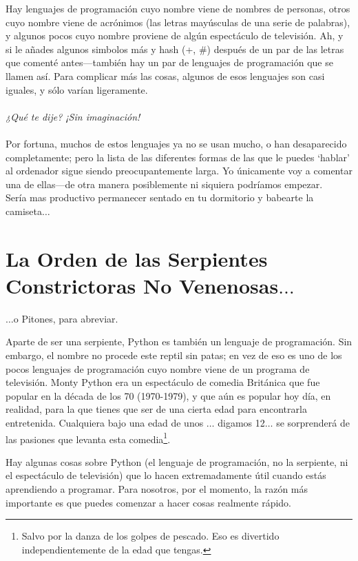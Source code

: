 Hay lenguajes de programación cuyo nombre viene de nombres de personas, otros cuyo nombre viene de acrónimos (las letras mayúsculas de una serie de palabras), y algunos pocos cuyo nombre proviene de algún espectáculo de televisión. Ah, y si le añades algunos simbolos más y hash (+, \#) después de un par de las letras que comenté antes---también hay un par de lenguajes de programación que se llamen así. Para complicar más las cosas, algunos de esos lenguajes son casi iguales, y sólo varían ligeramente.
\\
\\
\emph{¿Qué te dije? ¡Sin imaginación!}
\\
\\
Por fortuna, muchos de estos lenguajes ya no se usan mucho, o han desaparecido completamente; pero la lista de las diferentes formas de las que le puedes `hablar' al ordenador sigue siendo preocupantemente larga. Yo únicamente voy a comentar una de ellas---de otra manera posiblemente ni siquiera podríamos empezar.
\\
Sería mas productivo permanecer sentado en tu dormitorio y babearte la camiseta$\ldots$

\section{La Orden de las Serpientes Constrictoras No Venenosas$\ldots$}

$\ldots$o Pitones, para abreviar.

Aparte de ser una serpiente, Python es también un lenguaje de programación. Sin embargo, el nombre no procede este reptil sin patas; en vez de eso es uno de los pocos lenguajes de programación cuyo nombre viene de un programa de televisión. Monty Python era un espectáculo de comedia Británica que fue popular en la década de los 70 (1970-1979), y que aún es popular hoy día, en realidad, para la que tienes que ser de una cierta edad para encontrarla entretenida. Cualquiera bajo una edad de unos $\ldots$ digamos 12$\ldots$ se sorprenderá de las pasiones que levanta esta comedia\footnote{Salvo por la danza de los golpes de pescado. Eso es divertido independientemente de la edad que tengas.}.

Hay algunas cosas sobre Python (el lenguaje de programación, no la serpiente, ni el espectáculo de televisión) que lo hacen extremadamente útil cuando estás aprendiendo a programar. Para nosotros, por el momento, la razón más importante es que puedes comenzar a hacer cosas realmente rápido.

